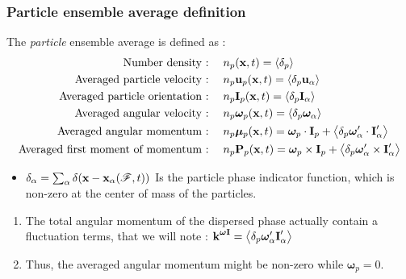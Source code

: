 \documentclass{sintefbeamer}
\begin{document}
\begin{frame}
  \frametitle{Particle ensemble average definition}
The  \textit{particle} ensemble  average is defined as : 
\begin{align*}
  \text{Number density : }\;\;\;&
  n_p (\textbf{x},t) =  \left<\delta_p  \right>\\
  \text{Averaged particle velocity : }\;\;\;&
  n_p \textbf{u}_p(\textbf{x},t) =  \left<\delta_p   \textbf{u}_\alpha\right>\\
  \text{Averaged particle orientation : }\;\;\;&
  n_p \textbf{I}_p(\textbf{x},t) =  \left<\delta_p   \textbf{I}_\alpha\right>\\
  \text{Averaged angular velocity  : }\;\;\;&
  n_p \bm\omega_p(\textbf{x},t) 
  =  
  \left<\delta_p   \bm\omega_\alpha\right>\\
  \text{Averaged angular momentum  : }\;\;\;&
  n_p \bm\mu_p(\textbf{x},t) =  
  \bm\omega_p \cdot \textbf{I}_p
  + \left<\delta_p   \bm\omega_\alpha'\cdot \textbf{I}_\alpha'\right> \\
  \text{Averaged first moment of momentum  : }\;\;\;&
  n_p \textbf P_p(\textbf{x},t) =  
  \bm\omega_p \times \textbf{I}_p
  + \left<\delta_p   \bm\omega_\alpha'\times \textbf{I}_\alpha'\right> \\
\end{align*}
\begin{definition}
  \begin{itemize}
    \item $\delta_\alpha = \sum_\alpha \delta(\textbf{x} - \textbf{x}_\alpha(\mathscr{F},t))$ Is the particle phase indicator function, which is non-zero at the center of mass of the particles. 
  \end{itemize}
\end{definition}

\begin{enumerate}
  \item The total angular momentum of the dispersed phase actually contain a fluctuation terms, that we will note : $\textbf k^{\bm\omega \textbf{I}} = \left<\delta_p   \bm\omega_\alpha' \textbf{I}_\alpha'\right> $
  \item Thus, the averaged angular momentum might be non-zero while $\bm\omega_p = 0$.
\end{enumerate}
\end{frame}
\end{document}
